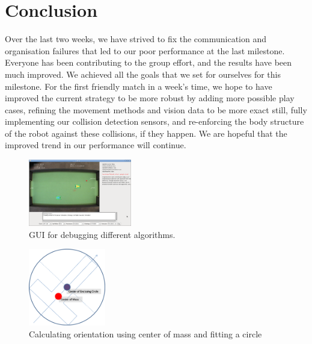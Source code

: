 \documentclass[conference,12pt]{IEEEtran}
\begin{document}
\section{Conclusion}
\vspace{-2 mm}
Over the last two weeks, we have strived to fix the communication and organisation failures that led to our poor performance at the last milestone. Everyone has been contributing to the group effort, and the results have been much improved. We achieved all the goals that we set for ourselves for this milestone. For the first friendly match in a week’s time, we hope to have improved the current strategy to be more robust by adding more possible play cases, refining the movement methods and vision data to be more exact still, fully implementing our collision detection sensors, and re-enforcing the body structure of the robot against these collisions, if they happen. We are hopeful that the improved trend in our performance will continue.
\pagebreak
\begin{figure}[htp]
\begin{center}
\leavevmode
\includegraphics[width=0.4\textwidth] {GUI.png}
\caption{GUI for debugging different algorithms.}
\end{center}
\label{fig:GUI}
\end{figure}

\begin{figure}[htp]
\begin{center}
\leavevmode
\includegraphics[width=0.3\textwidth] {orientation.png}
\caption{Calculating orientation using center of mass and fitting a circle}
\end{center}
\label{fig:centrMass}
\end{figure}
\end{document}
